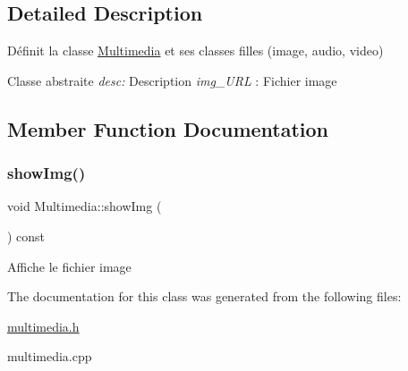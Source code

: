 \subsection{Detailed Description}
Définit la classe \hyperlink{class_multimedia}{Multimedia} et ses classes filles (image, audio, video) 

Classe abstraite {\itshape desc\+:} Description {\itshape img\+\_\+\+U\+RL} \+: Fichier image 

\subsection{Member Function Documentation}
\mbox{\label{class_multimedia_ac9c5f340806cbf1b93e8268c5c28ff92}} 
\subsubsection{\texorpdfstring{show\+Img()}{showImg()}}
{\footnotesize\ttfamily void Multimedia\+::show\+Img (\begin{DoxyParamCaption}{ }\end{DoxyParamCaption}) const}

Affiche le fichier image 

The documentation for this class was generated from the following files\+:\begin{DoxyCompactItemize}
\item 
\hyperlink{multimedia_8h}{multimedia.\+h}\item 
multimedia.\+cpp\end{DoxyCompactItemize}
